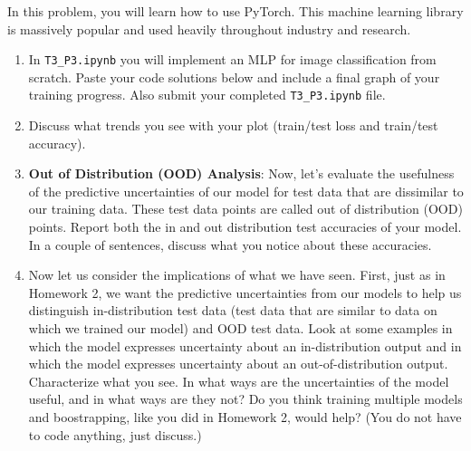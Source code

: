 \documentclass[submit]{harvardml}
\begin{document}
\newpage


\begin{problem}

In this problem, you will learn how to use PyTorch. This machine learning library is massively popular and used heavily throughout industry and research.


\begin{enumerate}
  \item In \verb|T3_P3.ipynb| you will implement an MLP for image classification from scratch. Paste your code solutions below and include a final graph of your training progress. Also submit your completed \verb|T3_P3.ipynb| file.
  \item Discuss what trends you see with your plot (train/test loss and train/test accuracy).

  \item \textbf{Out of Distribution (OOD) Analysis}: Now, let's evaluate the usefulness of the predictive uncertainties of our model for test data that are dissimilar to our training data. These test data points are called out of distribution (OOD) points. Report both the in and out distribution test accuracies of your model. In a couple of sentences, discuss what you notice about these accuracies.

  \item Now let us consider the implications of what we have seen.  First, just as in Homework 2, we want the predictive uncertainties from our models to help us distinguish in-distribution test data (test data that are similar to data on which we trained our model) and OOD test data.  Look at some examples in which the model expresses uncertainty about an in-distribution output and in which the model expresses uncertainty about an out-of-distribution output.  Characterize what you see.  In what ways are the uncertainties of the model useful, and in what ways are they not?  Do you think training multiple models and boostrapping, like you did in Homework 2, would help?  (You do not have to code anything, just discuss.)


\end{enumerate}
\end{problem}
\end{document}
